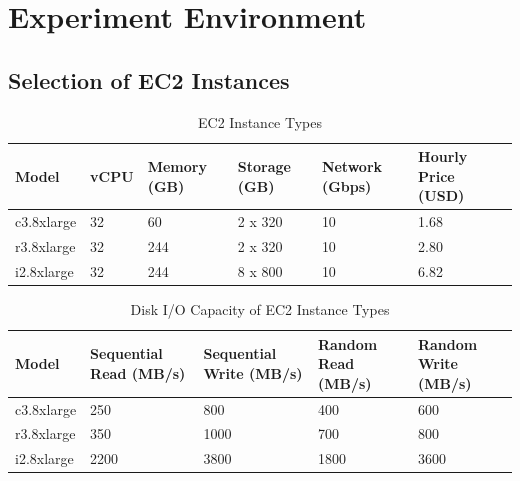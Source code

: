 \section{Experiment Environment}
\label{v2_sec:setup}

\subsection{Selection of EC2 Instances}
\label{sec:subsec:ec2_selection}


\begin{table}[t!]
\caption{EC2 Instance Types}
\label{tbl:instance_type}
\centering
\begin{tabular}{|p{2.5cm}|p{1.5cm}|p{1.5cm}|p{1.5cm}|p{1.5cm}|p{2.5cm}|}
\hline
Model & vCPU & Memory (GB) & Storage (GB) & Network (Gbps) & Hourly Price  (USD)\\ \hline
c3.8xlarge & 32 & 60  & 2 x 320 & 10 & 1.68\\ \hline
r3.8xlarge & 32 & 244 & 2 x 320 & 10 & 2.80\\ \hline
i2.8xlarge & 32 & 244 & 8 x 800 & 10 & 6.82\\ \hline
\end{tabular}
\end{table}



\begin{table}[t!]
\caption{Disk I/O Capacity of EC2 Instance Types}
\label{tbl:instance_disk_io}
\centering
\begin{tabular}{|p{2.5cm}|p{2.5cm}|p{2.5cm}|p{2.5cm}|p{2.5cm}|}
\hline
Model & Sequential Read (MB/s) & Sequential Write (MB/s) & Random Read (MB/s)& Random Write (MB/s)\\ \hline
c3.8xlarge & 250 & 800  & 400 & 600 \\ \hline
r3.8xlarge & 350 & 1000 & 700 & 800 \\ \hline
i2.8xlarge & 2200 & 3800 & 1800 & 3600 \\ \hline
\end{tabular}
\end{table}



